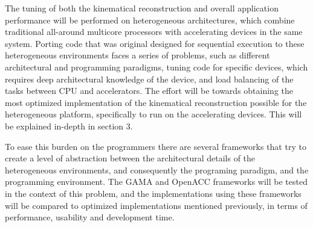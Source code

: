 The tuning of both the kinematical reconstruction and overall application performance will be performed on heterogeneous architectures, which combine traditional all-around multicore processors with accelerating devices in the same system. Porting code that was original designed for sequential execution to these heterogeneous environments faces a series of problems, such as different architectural and programming paradigms, tuning code for specific devices, which requires deep architectural knowledge of the device, and load balancing of the tasks between CPU and accelerators. The effort will be towards obtaining the most optimized implementation of the kinematical reconstruction possible for the heterogeneous platform, specifically to run on the accelerating devices. This will be explained in-depth in section 3.

To ease this burden on the programmers there are several frameworks that try to create a level of abstraction between the architectural details of the heterogeneous environments, and consequently the programing paradigm, and the programming environment. The GAMA and OpenACC frameworks will be tested in the context of this problem, and the implementations using these frameworks will be compared to optimized implementations mentioned previously, in terms of performance, usability and development time.

\newpage
